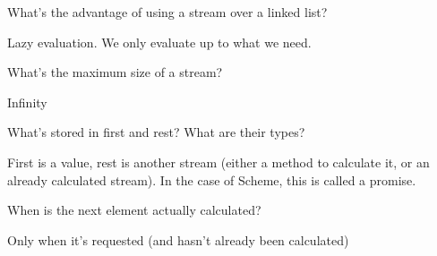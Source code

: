 \begin{blocksection}
\question What's the advantage of using a stream over a linked list?
\begin{solution}[1.0in]
Lazy evaluation. We only evaluate up to what we need.
\end{solution}

\question What's the maximum size of a stream?
\begin{solution}[1.0in]
Infinity
\end{solution}

\question What's stored in first and rest? What are their types?
\begin{solution}[1.0in]
First is a value, rest is another stream (either a method to calculate it, or an already calculated stream). In the case
 of Scheme, this is called a promise.
\end{solution}

\question When is the next element actually calculated?
\begin{solution}[1.0in]
Only when it's requested (and hasn't already been calculated)
\end{solution}
\end{blocksection}
